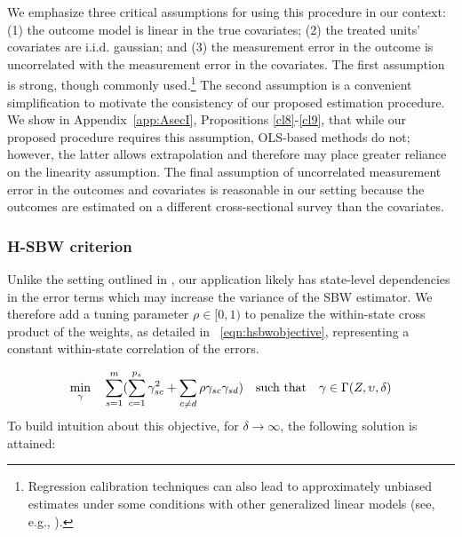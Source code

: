 \documentclass[aoas]{imsart}
\theoremstyle{plain}
\theoremstyle{remark}
\begin{document}
We emphasize three critical assumptions for using this procedure in our context: (1) the outcome model is linear in the true covariates; (2) the treated units' covariates are i.i.d. gaussian; and (3) the measurement error in the outcome is uncorrelated with the measurement error in the covariates. The first assumption is strong, though commonly used.\footnote{Regression calibration techniques can also lead to approximately unbiased estimates under some conditions with other generalized linear models (see, e.g., \cite{spiegelman2001efficient}).} The second assumption is a convenient simplification to motivate the consistency of our proposed estimation procedure. We show in Appendix~\ref{app:AsecI}, Propositions \ref{cl8}-\ref{cl9}, that while our proposed procedure requires this assumption, OLS-based methods do not; however, the latter  allows extrapolation and therefore may place greater reliance on the linearity assumption. The final assumption of uncorrelated measurement error in the outcomes and covariates is reasonable in our setting because the outcomes are estimated on a different cross-sectional survey than the covariates. 

\subsubsection{H-SBW criterion}\label{sssec:hsbw}

Unlike the setting outlined in \cite{zubizarreta2015stable}, our application likely has state-level dependencies in the error terms which may increase the variance of the SBW estimator. We therefore add a tuning parameter $\rho \in [0, 1)$ to penalize the within-state cross product of the weights, as detailed in ~\eqref{eqn:hsbwobjective}, representing a constant within-state correlation of the errors.

\begin{equation}\label{eqn:hsbwobjective}
\min_{\gamma} \quad \sum_{s=1}^{m}(\sum_{c = 1}^{p_s}\gamma_{sc}^2 + \sum_{c \ne d}\rho \gamma_{sc}\gamma_{sd}) \quad \text{such that} \quad \gamma \in \Gamma(Z, \upsilon, \delta)\\
\end{equation}
To build intuition about this objective, for $\delta \to \infty$, the following solution is attained:
\end{document}
